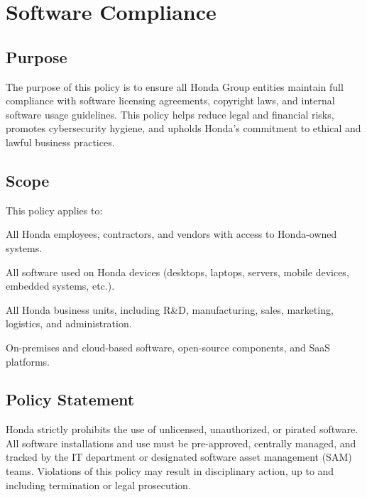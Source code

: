 \chapter{Software Compliance}
\pagestyle{fancy}

\fancyhf{}

\fancyfoot[C]{\thepage}

\renewcommand{\headrulewidth}{0pt}
\renewcommand{\footrulewidth}{0pt}

\section{Purpose}

The purpose of this policy is to ensure all Honda Group entities maintain full compliance with software licensing agreements, copyright laws, and internal software usage guidelines. This policy helps reduce legal and financial risks, promotes cybersecurity hygiene, and upholds Honda’s commitment to ethical and lawful 
business practices. 

\section{Scope}

This policy applies to:

All Honda employees, contractors, and vendors with access to Honda-owned systems.

All software used on Honda devices (desktops, laptops, servers, mobile devices, embedded systems, etc.).

All Honda business units, including R\&D, manufacturing, sales, marketing, logistics, and administration.

On-premises and cloud-based software, open-source components, and SaaS platforms.

\section{Policy Statement}

Honda strictly prohibits the use of unlicensed, unauthorized, or pirated software. All software installations and use must be pre-approved, centrally managed, and tracked by the IT department or designated software asset management (SAM) teams. Violations of this policy may result in disciplinary action, up to and including termination or legal prosecution.

